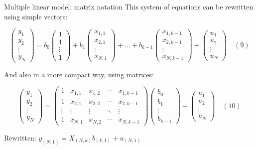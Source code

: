 \documentclass[aspectratio=169]{beamer}
\begin{document}
\begin{frame}{Multiple linear model: matrix notation}
This system of equations can be rewritten using simple vectors:

\[\begin{pmatrix} y_1 \\ y_2 \\ \vdots \\ y_N \end{pmatrix} = b_0 \begin{pmatrix} 1 \\ 1 \\ \vdots \\ 1 \end{pmatrix} + b_1 \begin{pmatrix} x_{1,1} \\ x_{2,1} \\ \vdots \\ x_{N,1} \end{pmatrix} + \dots + b_{k-1} \begin{pmatrix} x_{1,k-1} \\ x_{2,k-1} \\ \vdots \\ x_{N,k-1} \end{pmatrix} + \begin{pmatrix} u_1 \\ u_2 \\ \vdots \\ u_N \end{pmatrix} \quad (9)\]

And also in a more compact way, using matrices:

\[\begin{pmatrix} y_1 \\ y_2 \\ \vdots \\ y_N \end{pmatrix} = \begin{pmatrix} 1 & x_{1,1} & x_{1,2} & \cdots & x_{1,k-1} \\ 1 & x_{2,1} & x_{2,2} & \cdots & x_{2,k-1} \\ \vdots & \vdots & \vdots & \ddots & \vdots \\ 1 & x_{N,1} & x_{N,2} & \cdots & x_{N,k-1} \end{pmatrix} \begin{pmatrix} b_0 \\ b_1 \\ \vdots \\ b_{k-1} \end{pmatrix} + \begin{pmatrix} u_1 \\ u_2 \\ \vdots \\ u_N \end{pmatrix} \quad (10)\]

Rewritten: $y_{(N,1)} = X_{(N,k)} b_{(k,1)} + u_{(N,1)}$
\end{frame}
\end{document}

